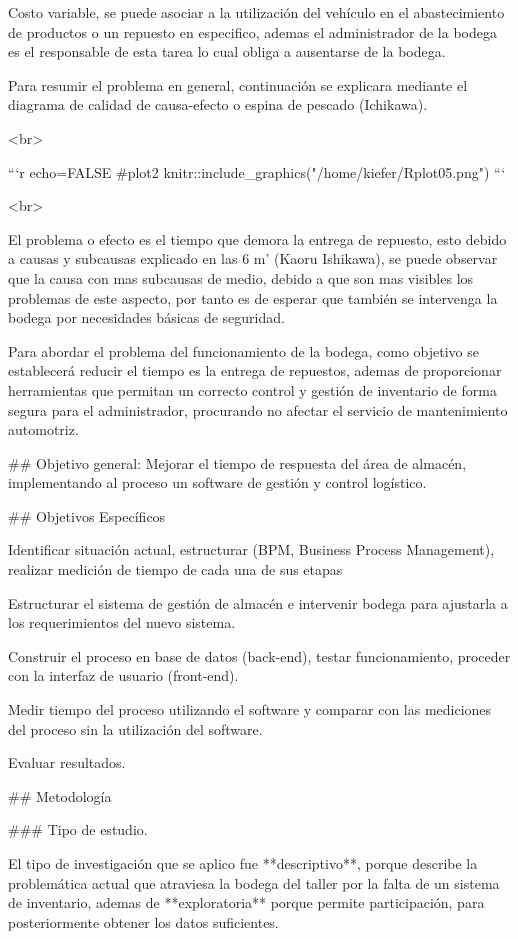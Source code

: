 \documentclass{article}\usepackage[]{graphicx}\usepackage[]{xcolor}
\begin{document}
Costo variable, se puede asociar a la utilización del vehículo en el abastecimiento de productos o un repuesto en especifico, ademas el administrador de la bodega es el responsable de esta tarea lo cual obliga a ausentarse de la bodega.

\pagebreak
Para resumir el problema en general, continuación se explicara mediante el diagrama de calidad de causa-efecto o espina de pescado (Ichikawa).

<br>

```{r echo=FALSE}
#plot2
knitr::include_graphics("/home/kiefer/Rplot05.png")
```

<br>

El problema o efecto es el tiempo que demora la entrega de repuesto, esto debido a causas y subcausas explicado en las 6 m' (Kaoru Ishikawa), se puede observar que la causa con mas subcausas de medio, debido a que son mas visibles los problemas de este aspecto, por tanto es de esperar que también se intervenga la bodega por necesidades básicas de seguridad.

Para abordar el problema del funcionamiento de la bodega, como objetivo se establecerá reducir el tiempo es la entrega de repuestos, ademas de proporcionar herramientas que permitan un correcto control y gestión de inventario de forma segura para el administrador, procurando no afectar el servicio de mantenimiento automotriz.

## Objetivo general:
Mejorar el tiempo de respuesta del área de almacén, implementando al proceso un software de gestión y control logístico.

## Objetivos Específicos

Identificar situación actual, estructurar (BPM, Business Process Management), realizar medición de tiempo de cada una de sus etapas

Estructurar el sistema de gestión de almacén e intervenir bodega para ajustarla a los requerimientos del nuevo sistema.

Construir el proceso en base de datos (back-end), testar funcionamiento, proceder con la interfaz de usuario (front-end).

Medir tiempo del proceso utilizando el software y comparar con las mediciones del proceso sin la utilización del software.

Evaluar resultados.

## Metodología

### Tipo de estudio.

El tipo de investigación que se aplico fue **descriptivo**, porque describe la problemática actual que atraviesa la bodega del taller por la falta de un sistema de inventario, ademas de **exploratoria** porque permite participación, para posteriormente obtener los datos suficientes.
\end{document}
